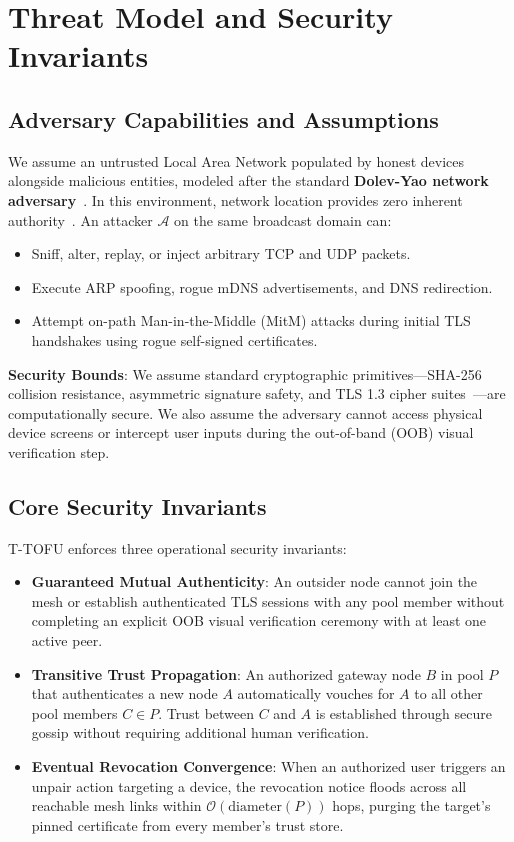 \documentclass[conference]{IEEEtran}
\begin{document}
\section{Threat Model and Security Invariants}

\subsection{Adversary Capabilities and Assumptions}
We assume an untrusted Local Area Network populated by honest devices alongside malicious entities, modeled after the standard \textbf{Dolev-Yao network adversary}~\cite{dolev1983security}. In this environment, network location provides zero inherent authority~\cite{rose2020zerotrust}. An attacker $\mathcal{A}$ on the same broadcast domain can:
\begin{itemize}
    \item Sniff, alter, replay, or inject arbitrary TCP and UDP packets.
    \item Execute ARP spoofing, rogue mDNS advertisements, and DNS redirection.
    \item Attempt on-path Man-in-the-Middle (MitM) attacks during initial TLS handshakes using rogue self-signed certificates.
\end{itemize}

\textbf{Security Bounds}: We assume standard cryptographic primitives—SHA-256 collision resistance, asymmetric signature safety, and TLS 1.3 cipher suites~\cite{rescorla2018tls}—are computationally secure. We also assume the adversary cannot access physical device screens or intercept user inputs during the out-of-band (OOB) visual verification step.

\subsection{Core Security Invariants}
T-TOFU enforces three operational security invariants:
\begin{itemize}
    \item \textbf{Guaranteed Mutual Authenticity}: An outsider node cannot join the mesh or establish authenticated TLS sessions with any pool member without completing an explicit OOB visual verification ceremony with at least one active peer.
    \item \textbf{Transitive Trust Propagation}: An authorized gateway node $B$ in pool $P$ that authenticates a new node $A$ automatically vouches for $A$ to all other pool members $C \in P$. Trust between $C$ and $A$ is established through secure gossip without requiring additional human verification.
    \item \textbf{Eventual Revocation Convergence}: When an authorized user triggers an unpair action targeting a device, the revocation notice floods across all reachable mesh links within $\mathcal{O}(\text{diameter}(P))$ hops, purging the target's pinned certificate from every member's trust store.
\end{itemize}
\end{document}
